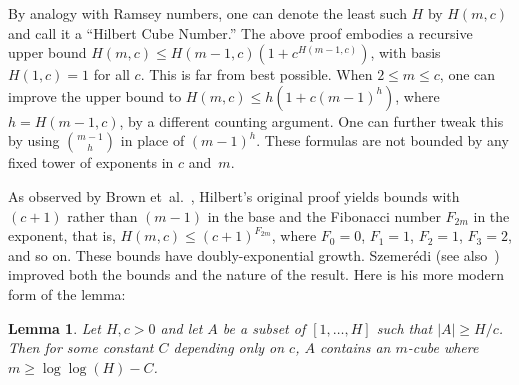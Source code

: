 \documentclass{article}
\theoremstyle{plain}
\newtheorem{lemma}[thm]{Lemma}
\theoremstyle{definition}
\renewcommand{\geq}{\geqslant}  %
\renewcommand{\leq}{\leqslant}  %
\begin{document}

By analogy with Ramsey numbers, one can denote the least such $H$ by $H(m,c)$ 
and call it a ``Hilbert Cube Number.''  
The above proof embodies a recursive upper bound
$H(m,c) \leq H(m-1,c)(1 + c^{H(m-1,c)})$, with basis $H(1,c) = 1$ for
all $c$. This is far from best possible. When
$2 \leq m \leq c$, one can improve the upper bound to 
$H(m,c) \leq h(1 + c(m-1)^{h})$, where $h = H(m-1,c)$, by a different
counting argument. One can further tweak this by using $\binom{m-1}{h}$ in
place of $(m-1)^h$. These formulas are not bounded by any fixed tower
of exponents in $c$ and~$m$.

As observed by Brown et~al.~\cite{BCEG}, Hilbert's original proof
yields bounds with $(c + 1)$ rather than $(m - 1)$ in the base and the
Fibonacci number $F_{2m}$ in the exponent, that is,
$H(m,c) \leq (c + 1)^{F_{2m}}$, where $F_0 = 0$, $F_1 = 1$, $F_2 = 1$,
$F_3 = 2$, and so on. These bounds have doubly-exponential growth.
Szemer\'edi \cite{Sz} (see also~\cite{GRS}) improved both the bounds
and the nature of the result.  Here is his more modern form of the lemma:

\begin{lemma}
Let $H,c > 0$ and let $A$ be a subset of
$[1,\dots,H]$ such that $|A| \geq H/c$.  Then for some constant $C$ depending
only on $c$, $A$ contains an
$m$-cube where $m \geq \log\log(H) - C$.
\end{lemma}


\end{document}
